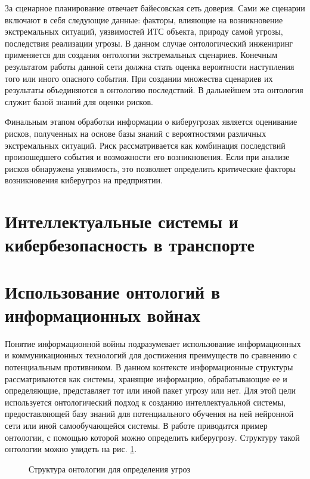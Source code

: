 За сценарное планирование отвечает байесовская сеть доверия. Сами же сценарии включают в себя следующие данные:
факторы, влияющие на возникновение экстремальных ситуаций, уязвимостей ИТС объекта, природу самой угрозы,
последствия реализации угрозы. В данном случае онтологический инжениринг применяется для создания онтологии
экстремальных сценариев. Конечным результатом работы данной сети должна стать оценка вероятности наступления
того или иного опасного события. При создании множества сценариев их результаты объединяются в онтологию
последствий. В дальнейшем эта онтология служит базой знаний для оценки рисков.

Финальным этапом обработки информации о киберугрозах является оценивание рисков, полученных на основе базы
знаний с вероятностями различных экстремальных ситуаций. Риск рассматривается как комбинация последствий
произошедшего события и возможности его возникновения. Если при анализе рисков обнаружена уязвимость, это
позволяет определить критические факторы возникновения киберугроз на предприятии.

\section{Интеллектуальные системы и кибербезопасность в транспорте}
\newpage

\section{Использование онтологий в информационных войнах}
Понятие информационной войны подразумевает использование информационных и коммуникационных
технологий для достижения преимуществ по сравнению с потенциальным противником. В данном контексте
информационные структуры рассматриваются как системы, хранящие информацию, обрабатывающие ее и определяющие,
представляет тот или иной пакет угрозу или нет. Для этой цели используется онтологический подход к созданию
интеллектуальной системы, предоставляющей базу знаний для потенциального обучения на ней нейронной сети
или иной самообучающейся системы. В работе \cite{wars} приводится пример онтологии, с помощью которой
можно определить киберугрозу. Структуру такой онтологии можно увидеть на рис. \ref{ont}.

\begin{figure}[h]
    \caption{Структура онтологии для определения угроз}
    \label{ont}
\end{figure}

